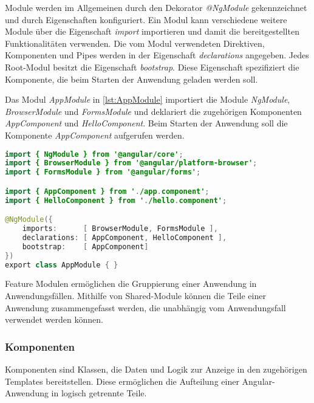 Module werden im Allgemeinen durch den Dekorator \textit{@NgModule} gekennzeichnet und durch Eigenschaften konfiguriert. Ein Modul kann verschiedene weitere Module über die Eigenschaft \textit{import} importieren und damit die bereitgestellten Funktionalitäten verwenden. Die vom Modul verwendeten Direktiven, Komponenten und Pipes werden in der Eigenschaft \textit{declarations} angegeben. Jedes Root-Modul besitzt die Eigenschaft \textit{bootstrap}. Diese Eigenschaft spezifiziert die Komponente, die beim Starten der Anwendung geladen werden soll. 

Das Modul \textit{AppModule} in \autoref{lst:AppModule} importiert die Module \textit{NgModule}, \textit{BrowserModule} und \textit{FormsModule} und deklariert die zugehörigen Komponenten \textit{AppComponent} und \textit{HelloComponent}. Beim Starten der Anwendung soll die Komponente \textit{AppComponent} aufgerufen werden.

\begin{lstlisting}[caption=Das Root-Module in der Datei app.module.ts, label=lst:AppModule, language=Java]
import { NgModule } from '@angular/core';
import { BrowserModule } from '@angular/platform-browser';
import { FormsModule } from '@angular/forms';

import { AppComponent } from './app.component';
import { HelloComponent } from './hello.component';

@NgModule({
	imports:      [ BrowserModule, FormsModule ],
	declarations: [ AppComponent, HelloComponent ],
	bootstrap:    [ AppComponent]
})
export class AppModule { }

\end{lstlisting}

Feature Modulen ermöglichen die Gruppierung einer Anwendung in Anwendungsfällen. Mithilfe von Shared-Module können die Teile einer Anwendung zusammengefasst werden, die unabhängig vom Anwendungsfall verwendet werden können. \autocites[vgl.][528\psqq]{Freeman.2018}[vgl.][]{Google.c}[vgl.][105\psqq]{Steyer.2017}

\subsubsection{Komponenten}

Komponenten sind Klassen, die Daten und Logik zur Anzeige in den zugehörigen Templates bereitstellen. Diese ermöglichen die Aufteilung einer Angular-Anwendung in logisch getrennte Teile. \autocite[vgl.][401]{Freeman.2018} 

